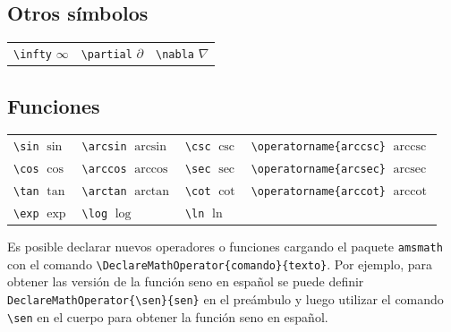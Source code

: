 \documentclass[
  a4paper,
]{scrreport}
\theoremstyle{definition}
\theoremstyle{remark}
\begin{document}
\subsection{Otros símbolos}\label{otros-suxedmbolos}

\begin{longtable}[]{@{}lll@{}}
\toprule\noalign{}
\endhead
\bottomrule\noalign{}
\endlastfoot
\texttt{\textbackslash{}infty} \(\infty\) &
\texttt{\textbackslash{}partial} \(\partial\) &
\texttt{\textbackslash{}nabla} \(\nabla\) \\
\end{longtable}

\subsection{Funciones}\label{funciones}

\begin{longtable}[]{@{}
  >{\raggedright\arraybackslash}p{}
  >{\raggedright\arraybackslash}p{}
  >{\raggedright\arraybackslash}p{}
  >{\raggedright\arraybackslash}p{}@{}}
\toprule\noalign{}
\endhead
\bottomrule\noalign{}
\endlastfoot
\texttt{\textbackslash{}sin} \(\sin\) & \texttt{\textbackslash{}arcsin}
\(\arcsin\) & \texttt{\textbackslash{}csc} \(\csc\) &
\texttt{\textbackslash{}operatorname\{arccsc\}}
\(\operatorname{arccsc}\) \\
\texttt{\textbackslash{}cos} \(\cos\) & \texttt{\textbackslash{}arccos}
\(\arccos\) & \texttt{\textbackslash{}sec} \(\sec\) &
\texttt{\textbackslash{}operatorname\{arcsec\}}
\(\operatorname{arcsec}\) \\
\texttt{\textbackslash{}tan} \(\tan\) & \texttt{\textbackslash{}arctan}
\(\arctan\) & \texttt{\textbackslash{}cot} \(\cot\) &
\texttt{\textbackslash{}operatorname\{arccot\}}
\(\operatorname{arccot}\) \\
\texttt{\textbackslash{}exp} \(\exp\) & \texttt{\textbackslash{}log}
\(\log\) & \texttt{\textbackslash{}ln} \(\ln\) & \\
\end{longtable}

Es posible declarar nuevos operadores o funciones cargando el paquete
\texttt{amsmath} con el comando
\texttt{\textbackslash{}DeclareMathOperator\{comando\}\{texto\}}. Por
ejemplo, para obtener las versión de la función seno en español se puede
definir \texttt{DeclareMathOperator\{\textbackslash{}sen\}\{sen\}} en el
preámbulo y luego utilizar el comando \texttt{\textbackslash{}sen} en el
cuerpo para obtener la función seno en español.
\end{document}
